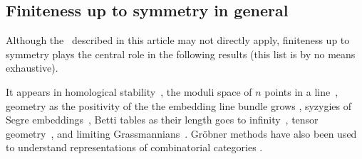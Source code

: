 \subsection{Finiteness up to symmetry in general}
Although the \EGBs\ described in this article may not directly apply, finiteness up to symmetry plays the central role in the following results (this list is by no means exhaustive).  

It appears in homological stability~\cite{randal2013homological, church2012homological},  the moduli space of $n$ points in a line~\cite{howard2009equations}, geometry as the positivity of the the embedding line bundle grows \cite{ein2012asymptotic}, syzygies of Segre embeddings~\cite{snowden2013syzygies}, Betti tables as their length goes to infinity~\cite{ein2015asymptotics}, tensor geometry~\cite{draisma2014bounded, draisma2015finiteness}, and limiting Grassmannians~\cite{draisma2015plucker}.
Gr\"obner methods have also been used to understand representations of combinatorial categories \cite{sam2016grobner}.


